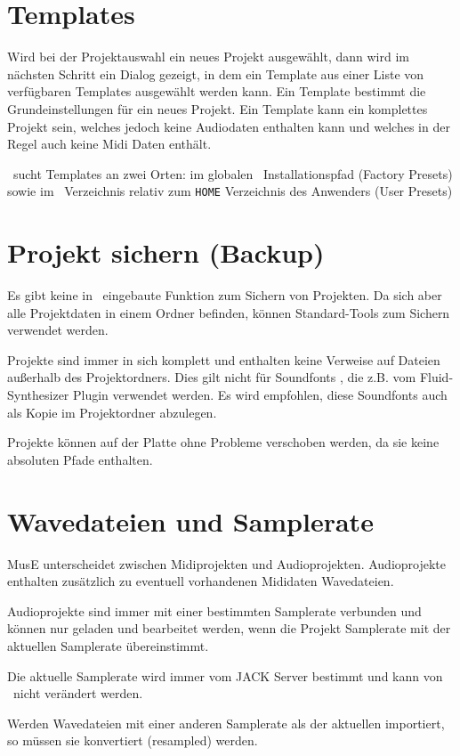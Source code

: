    \section{Templates}

      Wird bei der Projektauswahl ein neues Projekt ausgewählt, dann
      wird im nächsten Schritt ein Dialog gezeigt, in dem ein Template
      aus einer Liste von verfügbaren Templates ausgewählt werden kann.
      Ein Template bestimmt die Grundeinstellungen für ein neues
      Projekt. Ein Template kann ein komplettes Projekt sein, welches
      jedoch keine Audiodaten enthalten kann und welches in der Regel
      auch keine Midi Daten enthält.


      \M\ sucht Templates an zwei Orten:
      im globalen \M\ Installationspfad (Factory Presets) sowie im 
      \M\ Verzeichnis relativ zum {\tt HOME} Verzeichnis des
      Anwenders (User Presets)

   \section{Projekt sichern (Backup)}

      Es gibt keine in \M\ eingebaute Funktion zum Sichern von Projekten.
      Da sich aber alle Projektdaten in einem Ordner befinden,
      können Standard-Tools zum Sichern verwendet werden.

      Projekte sind immer in sich komplett und enthalten keine Verweise
      auf Dateien außerhalb des Projektordners. Dies gilt nicht
      für Soundfonts , die z.B. vom Fluid-Synthesizer 
      Plugin verwendet werden. 
      Es wird empfohlen, diese Soundfonts 
      auch als Kopie im Projektordner abzulegen.

      Projekte können auf der Platte ohne Probleme verschoben werden,
      da sie keine absoluten Pfade enthalten.

   \section{Wavedateien und Samplerate}

      MusE unterscheidet zwischen Midiprojekten und Audioprojekten.
      Audioprojekte enthalten zusätzlich zu eventuell vorhandenen
      Mididaten Wavedateien.
      
      Audioprojekte sind immer mit einer bestimmten Samplerate
      verbunden und können nur geladen und bearbeitet werden, wenn
      die Projekt Samplerate mit der aktuellen Samplerate übereinstimmt.

      Die aktuelle Samplerate wird immer vom JACK Server bestimmt und
      kann von \M\ nicht verändert werden.

      Werden Wavedateien mit einer anderen Samplerate als der aktuellen
      importiert, so müssen sie konvertiert (resampled) 
      werden.

